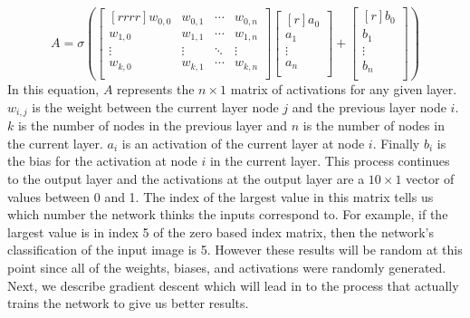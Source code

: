 \documentclass[12pt]{article}
\theoremstyle{definition}
\theoremstyle{plain}
\begin{document}
\begin{equation}\label{eqn:Activation}
A = \sigma \left( \begin{bmatrix}[rrrr]
	w_{0,0} & w_{0,1} & \cdots & w_{0,n}\\
	w_{1,0} & w_{1,1} & \cdots & w_{1,n}\\
	\vdots & \vdots & \ddots & \vdots\\
	w_{k,0} & w_{k,1} & \cdots & w_{k,n}\\\end{bmatrix}
	\begin{bmatrix}[r]
	a_0\\
	a_1\\
	\vdots\\
	a_n\\\end{bmatrix} +
	\begin{bmatrix}[r]
	b_0\\
	b_1\\
	\vdots\\
	b_n\\\end{bmatrix} \right)
\end{equation}
In this equation, $A$ represents the $n\times 1$ matrix of activations for any given layer. $w_{i,j}$ is the weight between the current layer node $j$ and the previous layer node $i$. $k$ is the number of nodes in the previous layer and $n$ is the number of nodes in the current layer. $a_i$ is an activation of the current layer at node $i$. Finally $b_i$ is the bias for the activation at node $i$ in the current layer. This process continues to the output layer and the activations at the output layer are a $10\times 1$ vector of values between 0 and 1. The index of the largest value in this matrix tells us which number the network thinks the inputs correspond to. For example, if the largest value is in index 5 of the zero based index matrix, then the network's classification of the input image is 5. However these results will be random at this point since all of the weights, biases, and activations were randomly generated. Next, we describe gradient descent which will lead in to the process that actually trains the network to give us better results.
\end{document}
